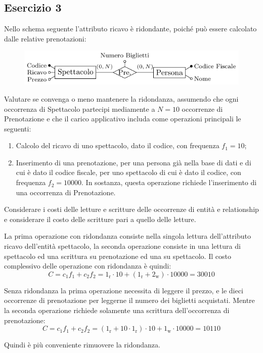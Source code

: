 \documentclass{article}
\numberwithin{equation}{subsection}
\begin{document}
\subsection{Esercizio 3}

Nello schema seguente l'attributo ricavo è ridondante, poiché può essere calcolato dalle relative prenotazioni: 

\begin{figure}[H]%
    \centering
    \includegraphics[scale=1.25]{domanda_2-12-24.pdf}%
\end{figure}

Valutare se convenga o meno mantenere la ridondanza, assumendo che ogni occorrenza di Spettacolo partecipi mediamente a $N=10$ occorrenze di Prenotazione e che il carico applicativo includa 
come operazioni principali le seguenti:
\begin{enumerate}
    \item Calcolo del ricavo di uno spettacolo, dato il codice, con frequenza $f_1 = 10$;
    \item Inserimento di una prenotazione, per una persona già nella base di dati e di cui è dato il codice fiscale, per uno spettacolo di cui è dato il codice, con frequenza $f_2 = 10000$. 
    In sostanza, questa operazione richiede l'inserimento di una occorrenza di Prenotazione. 
\end{enumerate}
Considerare i costi delle letture e scritture delle occorrenze di entità e relationship e considerare il costo delle scritture pari a quello delle letture. 

La prima operazione con ridondanza consiste nella singola lettura dell'attributo ricavo dell'entità spettacolo, la seconda 
operazione consiste in una lettura di spettacolo ed una scrittura su prenotazione ed una su spettacolo. Il 
costo complessivo delle operazione con ridondanza è quindi:
\begin{equation*}
    C=c_1f_1+c_2f_2=1_\mathrm{r}\cdot10+(1_\mathrm{r}+2_\mathrm{w})\cdot10000=30010
\end{equation*}

Senza ridondanza la prima operazione necessita di leggere il prezzo, e le dieci occorrenze di 
prenotazione per leggerne il numero dei biglietti acquistati. Mentre la 
seconda operazione richiede solamente una scrittura dell'occorrenza di prenotazione:
\begin{equation*}
    C=c_1f_1+c_2f_2=(1_\mathrm{r}+10\cdot1_\mathrm{r})\cdot10+1_\mathrm{w}\cdot10000=10110
\end{equation*}

Quindi è più conveniente rimuovere la ridondanza. 

\clearpage
\end{document}
